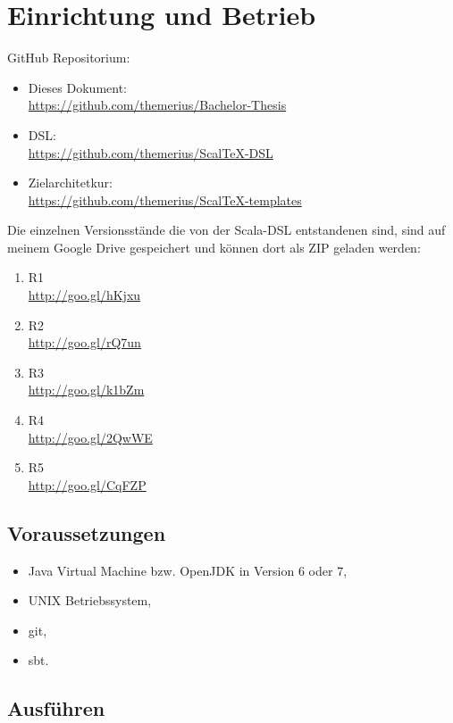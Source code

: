 \chapter{Einrichtung und Betrieb}

GitHub Repositorium:

\begin{itemize}
  \item Dieses Dokument:\\
        \url{https://github.com/themerius/Bachelor-Thesis}
  \item DSL:\\
        \url{https://github.com/themerius/ScalTeX-DSL}
  \item Zielarchitetkur:\\
        \url{https://github.com/themerius/ScalTeX-templates}
\end{itemize}

Die einzelnen Versionsstände die von der Scala-DSL entstandenen sind,
sind auf meinem Google Drive gespeichert und können dort als ZIP
geladen werden:

\begin{enumerate}
  \item R1\\
        \url{http://goo.gl/hKjxu}
  \item R2\\
        \url{http://goo.gl/rQ7un}
  \item R3\\
        \url{http://goo.gl/k1bZm}
  \item R4\\
        \url{http://goo.gl/2QwWE}
  \item R5\\
        \url{http://goo.gl/CqFZP}
\end{enumerate}

\section{Voraussetzungen}

\begin{itemize}
  \item Java Virtual Machine bzw. OpenJDK in Version 6 oder 7,
  \item UNIX Betriebssystem,
  \item git,
  \item sbt.
\end{itemize}

\section{Ausführen}

